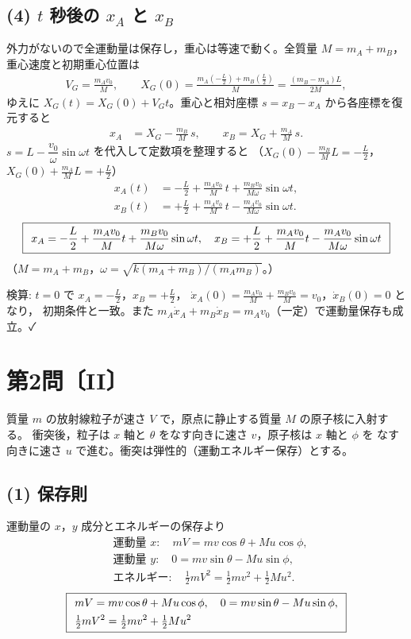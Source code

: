 \documentclass[11pt,a4paper]{article}
\begin{document}
\subsection*{(4) $t$ 秒後の $x_A$ と $x_B$}
外力がないので全運動量は保存し，重心は等速で動く。全質量 $M=m_A+m_B$，
重心速度と初期重心位置は
\begin{align*}
  V_G=\frac{m_A v_0}{M},\qquad
  X_G(0)=\frac{m_A(-\frac{L}{2})+m_B(\frac{L}{2})}{M}
        =\frac{(m_B-m_A)L}{2M},
\end{align*}
ゆえに $X_G(t)=X_G(0)+V_G t$。重心と相対座標 $s=x_B-x_A$ から各座標を復元すると
\begin{align*}
  x_A &= X_G-\frac{m_B}{M}\,s,\qquad
  x_B  = X_G+\frac{m_A}{M}\,s.
\end{align*}
$s=L-\dfrac{v_0}{\omega}\sin\omega t$ を代入して定数項を整理すると
（$X_G(0)-\frac{m_B}{M}L=-\frac{L}{2}$，$X_G(0)+\frac{m_A}{M}L=+\frac{L}{2}$）
\begin{align*}
  x_A(t) &= -\frac{L}{2}+\frac{m_A v_0}{M}\,t
            +\frac{m_B v_0}{M\omega}\sin\omega t,\\
  x_B(t) &= +\frac{L}{2}+\frac{m_A v_0}{M}\,t
            -\frac{m_A v_0}{M\omega}\sin\omega t.
\end{align*}
\[
  \boxed{\,\;
  x_A=-\dfrac{L}{2}+\dfrac{m_A v_0}{M}t+\dfrac{m_B v_0}{M\omega}\sin\omega t,\quad
  x_B=+\dfrac{L}{2}+\dfrac{m_A v_0}{M}t-\dfrac{m_A v_0}{M\omega}\sin\omega t\;\,}
\]
（$M=m_A+m_B$，$\omega=\sqrt{k(m_A+m_B)/(m_A m_B)}$。）

\medskip
検算: $t=0$ で $x_A=-\frac{L}{2}$，$x_B=+\frac{L}{2}$，
$\dot{x}_A(0)=\frac{m_A v_0}{M}+\frac{m_B v_0}{M}=v_0$，$\dot{x}_B(0)=0$ となり，
初期条件と一致。また $m_A\dot{x}_A+m_B\dot{x}_B=m_A v_0$（一定）で運動量保存も成立。✓

\clearpage
\section*{第2問〔II〕}

質量 $m$ の放射線粒子が速さ $V$ で，原点に静止する質量 $M$ の原子核に入射する。
衝突後，粒子は $x$ 軸と $\theta$ をなす向きに速さ $v$，原子核は $x$ 軸と $\phi$ を
なす向きに速さ $u$ で進む。衝突は弾性的（運動エネルギー保存）とする。

\subsection*{(1) 保存則}
運動量の $x$，$y$ 成分とエネルギーの保存より
\begin{align*}
  &\text{運動量 }x:\quad mV = m v\cos\theta + M u\cos\phi,\\
  &\text{運動量 }y:\quad 0 = m v\sin\theta - M u\sin\phi,\\
  &\text{エネルギー}:\quad \tfrac{1}{2}mV^2 = \tfrac{1}{2}m v^2 + \tfrac{1}{2}M u^2.
\end{align*}
\[
  \boxed{\,\;
  \begin{aligned}
    &mV = m v\cos\theta + M u\cos\phi,\quad
     0 = m v\sin\theta - M u\sin\phi,\\
    &\tfrac{1}{2}mV^2 = \tfrac{1}{2}m v^2 + \tfrac{1}{2}M u^2
  \end{aligned}\;\,}
\]
\end{document}
